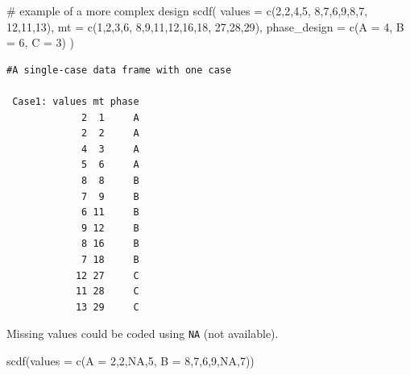 \documentclass[
  letterpaper,
  DIV=11,
  numbers=noendperiod]{scrreprt}
\newenvironment{Shaded}{\begin{snugshade}}{\end{snugshade}}
\newcommand{\AttributeTok}[1]{\textcolor[rgb]{0.40,0.45,0.13}{#1}}
\newcommand{\CommentTok}[1]{\textcolor[rgb]{0.37,0.37,0.37}{#1}}
\newcommand{\ConstantTok}[1]{\textcolor[rgb]{0.56,0.35,0.01}{#1}}
\newcommand{\DecValTok}[1]{\textcolor[rgb]{0.68,0.00,0.00}{#1}}
\newcommand{\FunctionTok}[1]{\textcolor[rgb]{0.28,0.35,0.67}{#1}}
\newcommand{\NormalTok}[1]{\textcolor[rgb]{0.00,0.23,0.31}{#1}}
\begin{document}
\begin{Shaded}
\begin{Highlighting}[]
\CommentTok{\# example of a more complex design }
\FunctionTok{scdf}\NormalTok{(}
  \AttributeTok{values =} \FunctionTok{c}\NormalTok{(}\DecValTok{2}\NormalTok{,}\DecValTok{2}\NormalTok{,}\DecValTok{4}\NormalTok{,}\DecValTok{5}\NormalTok{, }\DecValTok{8}\NormalTok{,}\DecValTok{7}\NormalTok{,}\DecValTok{6}\NormalTok{,}\DecValTok{9}\NormalTok{,}\DecValTok{8}\NormalTok{,}\DecValTok{7}\NormalTok{, }\DecValTok{12}\NormalTok{,}\DecValTok{11}\NormalTok{,}\DecValTok{13}\NormalTok{), }
  \AttributeTok{mt =} \FunctionTok{c}\NormalTok{(}\DecValTok{1}\NormalTok{,}\DecValTok{2}\NormalTok{,}\DecValTok{3}\NormalTok{,}\DecValTok{6}\NormalTok{, }\DecValTok{8}\NormalTok{,}\DecValTok{9}\NormalTok{,}\DecValTok{11}\NormalTok{,}\DecValTok{12}\NormalTok{,}\DecValTok{16}\NormalTok{,}\DecValTok{18}\NormalTok{, }\DecValTok{27}\NormalTok{,}\DecValTok{28}\NormalTok{,}\DecValTok{29}\NormalTok{),}
  \AttributeTok{phase\_design =} \FunctionTok{c}\NormalTok{(}\AttributeTok{A =} \DecValTok{4}\NormalTok{, }\AttributeTok{B =} \DecValTok{6}\NormalTok{, }\AttributeTok{C =} \DecValTok{3}\NormalTok{)}
\NormalTok{)}
\end{Highlighting}
\end{Shaded}

\begin{verbatim}
#A single-case data frame with one case

 Case1: values mt phase
             2  1     A
             2  2     A
             4  3     A
             5  6     A
             8  8     B
             7  9     B
             6 11     B
             9 12     B
             8 16     B
             7 18     B
            12 27     C
            11 28     C
            13 29     C
\end{verbatim}

Missing values could be coded using \texttt{NA} (not available).

\begin{Shaded}
\begin{Highlighting}[]
\FunctionTok{scdf}\NormalTok{(}\AttributeTok{values =} \FunctionTok{c}\NormalTok{(}\AttributeTok{A =} \DecValTok{2}\NormalTok{,}\DecValTok{2}\NormalTok{,}\ConstantTok{NA}\NormalTok{,}\DecValTok{5}\NormalTok{, }\AttributeTok{B =} \DecValTok{8}\NormalTok{,}\DecValTok{7}\NormalTok{,}\DecValTok{6}\NormalTok{,}\DecValTok{9}\NormalTok{,}\ConstantTok{NA}\NormalTok{,}\DecValTok{7}\NormalTok{))}
\end{Highlighting}
\end{Shaded}
\end{document}
